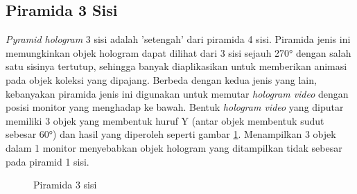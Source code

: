 	\subsection{Piramida 3 Sisi}
	\vspace{1ex}
	\textit{Pyramid hologram} 3 sisi adalah 'setengah' dari piramida 4 sisi. Piramida jenis ini memungkinkan objek hologram dapat dilihat dari 3 sisi sejauh 270° dengan salah satu sisinya tertutup, sehingga banyak diaplikasikan untuk memberikan animasi pada objek koleksi yang dipajang\cite{ironman}. Berbeda dengan kedua jenis yang lain, kebanyakan piramida jenis ini digunakan untuk memutar \textit{hologram video} dengan posisi monitor yang menghadap ke bawah. Bentuk \textit{hologram video} yang diputar memiliki 3 objek yang membentuk huruf Y (antar objek membentuk sudut sebesar 60°) dan hasil yang diperoleh seperti gambar \ref{fig:piramid3}. Menampilkan 3 objek dalam 1 monitor menyebabkan objek hologram yang ditampilkan tidak sebesar pada piramid 1 sisi.
	\begin{figure} [H]
		\hspace{0.1em}
		\caption{Piramida 3 sisi}
		\label{fig:piramid3}
	\end{figure}
	\vspace{1.5ex}
	
